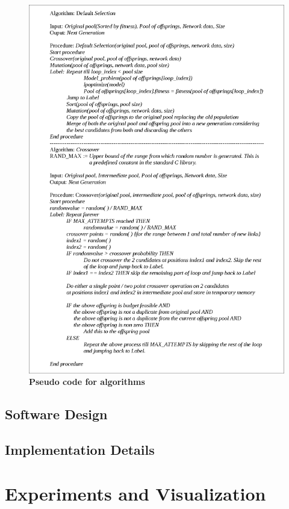 \documentclass[a4paper, 12pt]{article}
\begin{document}
\begin{figure}[htbp]
\hspace*{-0.10in}
\includegraphics[scale=0.85]{./diagram2.eps}
\caption{\textbf{Pseudo code for algorithms}}
\label{fig 3}
\end{figure}
\subsection{Software Design}
\subsection{Implementation Details}
\newpage
\section{Experiments and Visualization}
\end{document}
